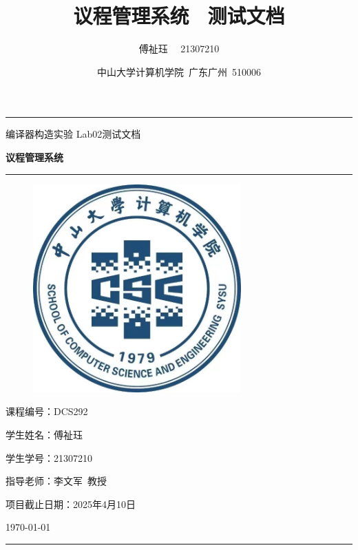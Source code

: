 \documentclass[a4paper, twoside, utf8]{ctexart}
\title{\songti \bfseries 议程管理系统 \ 测试文档}
\author{\fangsong 傅祉珏 \ \ 21307210}
\date{\fangsong 中山大学计算机学院\ 广东广州\ 510006}
\begin{document}
	
	\begin{titlepage}
		\centering
		\rule{\textwidth}{1pt}
		\vspace{0.02\textheight}
		
		{\LARGE \kaishu 编译器构造实验 \quad Lab02测试文档}
		
		\vspace{0.02\textheight}
		
		{\Huge \songti \bfseries 议程管理系统}
		
        \vspace{0.025\textheight}
        \rule{0.83\textwidth}{0.4pt}
        \vspace{0.05\textheight} 
        
        \begin{figure}[htbp]
            \centering
            \includegraphics[width=8cm, height=8cm]{./figure/计院院徽.jpg}
        \end{figure}

        \vspace{0.05\textheight} 
        {\Large 课程编号：\textsc{DCS292}}

        \vspace{0.025\textheight} 
        {\Large 学生姓名：\textsc{傅祉珏}}

        \vspace{0.025\textheight} 
        {\Large 学生学号：\textsc{21307210}}

        \vspace{0.025\textheight} 
        {\Large 指导老师：\textsc{李文军\ 教授}}
 
        \vspace{0.025\textheight} 
        {\Large 项目截止日期：\textsc{2025年4月10日}}

        \vspace{0.05\textheight} 
        \vfill

        {\large \today}
        \vspace{0.1\textheight}
        \rule{\textwidth}{1pt}
    \end{titlepage}
	
\end{document}
